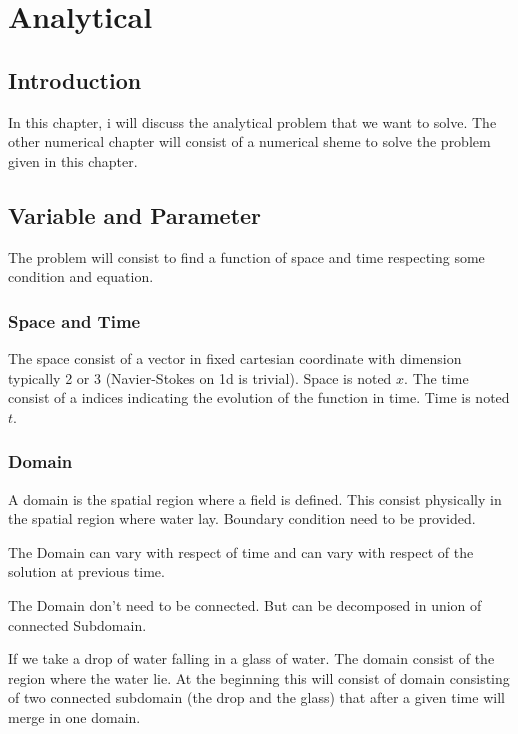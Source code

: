 \chapter{Analytical}
\minitoc
\section{Introduction}
In this chapter, i will discuss the analytical problem that we want to solve.
The other numerical chapter will consist of a numerical sheme to solve the problem given in this chapter.

\section{Variable and Parameter}

The problem will consist to find a function of space and time respecting some condition and equation.

\subsection{Space and Time}

The space consist of a vector in fixed cartesian coordinate with dimension typically 2 or 3 (Navier-Stokes on 1d is trivial).
Space is noted $x$.
The time consist of a indices indicating the evolution of the function in time.
Time is noted $t$.

\subsection{Domain}

A domain is the spatial region where a field is defined. This consist physically in the spatial region where water lay.
Boundary condition need to be provided.

The Domain can vary with respect of time and can vary with respect of the solution at previous time.

The Domain don't need to be connected. But can be decomposed in union of connected Subdomain.

\begin{example}
 If we take a drop of water falling in a glass of water. The domain consist of the region where the water lie.
 At the beginning this will consist of domain consisting of two connected subdomain (the drop and the glass)
 that after a given time will merge in one domain.
\end{example}

